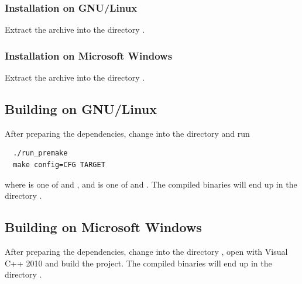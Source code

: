 \subsubsection{Installation on GNU/Linux}

Extract the archive into the directory .

\subsubsection{Installation on Microsoft Windows}

Extract the archive into the directory .

\subsection{Building on GNU/Linux}

After preparing the dependencies, change into the directory  and
run

\begin{verbatim}
  ./run_premake
  make config=CFG TARGET
\end{verbatim}

where  is one of  and
, and  is one of
 and .  The
compiled binaries will end up in the directory .

\subsection{Building on Microsoft Windows}

After preparing the dependencies, change into the directory
, open  with Visual C++
2010 and build the project.  The compiled binaries will end up in the
directory .




